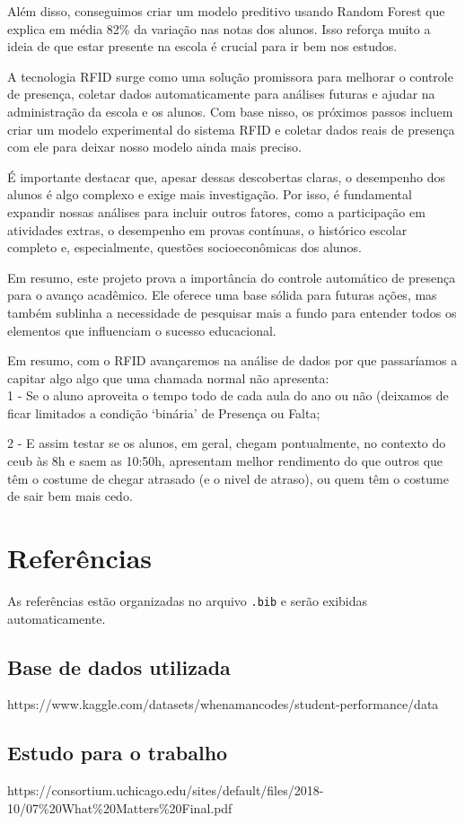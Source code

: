 \documentclass[
  letterpaper,
  DIV=11,
  numbers=noendperiod,
  openany]{scrreprt}
\begin{document}
Além disso, conseguimos criar um modelo preditivo usando Random Forest
que explica em média 82\% da variação nas notas dos alunos. Isso reforça
muito a ideia de que estar presente na escola é crucial para ir bem nos
estudos.

A tecnologia RFID surge como uma solução promissora para melhorar o
controle de presença, coletar dados automaticamente para análises
futuras e ajudar na administração da escola e os alunos. Com base nisso,
os próximos passos incluem criar um modelo experimental do sistema RFID
e coletar dados reais de presença com ele para deixar nosso modelo ainda
mais preciso.

É importante destacar que, apesar dessas descobertas claras, o
desempenho dos alunos é algo complexo e exige mais investigação. Por
isso, é fundamental expandir nossas análises para incluir outros
fatores, como a participação em atividades extras, o desempenho em
provas contínuas, o histórico escolar completo e, especialmente,
questões socioeconômicas dos alunos.

Em resumo, este projeto prova a importância do controle automático de
presença para o avanço acadêmico. Ele oferece uma base sólida para
futuras ações, mas também sublinha a necessidade de pesquisar mais a
fundo para entender todos os elementos que influenciam o sucesso
educacional.

Em resumo, com o RFID avançaremos na análise de dados por que
passaríamos a capitar algo algo que uma chamada normal não apresenta:\\

1 - Se o aluno aproveita o tempo todo de cada aula do ano ou não
(deixamos de ficar limitados a condição `binária' de Presença ou Falta;

2 - E assim testar se os alunos, em geral, chegam pontualmente, no
contexto do ceub às 8h e saem as 10:50h, apresentam melhor rendimento do
que outros que têm o costume de chegar atrasado (e o nivel de atraso),
ou quem têm o costume de sair bem mais cedo.


\chapter{Referências}\label{referuxeancias}

As referências estão organizadas no arquivo \texttt{.bib} e serão
exibidas automaticamente.

\section{Base de dados utilizada}\label{base-de-dados-utilizada}

https://www.kaggle.com/datasets/whenamancodes/student-performance/data

\section{Estudo para o trabalho}\label{estudo-para-o-trabalho}

https://consortium.uchicago.edu/sites/default/files/2018-10/07\%20What\%20Matters\%20Final.pdf

\label{refs}
\end{document}
